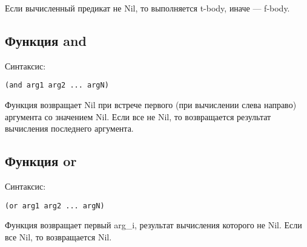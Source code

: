 Если вычисленный предикат не Nil, то выполняется t-body, иначе ---
\mbox{f-body}.

\subsection{Функция and}

Синтаксис:

\vspace{4mm}
\begin{minipage}{0.92\linewidth}
\begin{lstlisting}
(and arg1 arg2 ... argN)
\end{lstlisting}
\end{minipage}

Функция возвращает Nil при встрече первого (при вычислении слева направо)
аргумента со значением Nil. Если
все не Nil, то возвращается результат вычисления последнего аргумента.

\subsection{Функция or}

Синтаксис:

\vspace{4mm}
\begin{minipage}{0.92\linewidth}
\begin{lstlisting}
(or arg1 arg2 ... argN)
\end{lstlisting}
\end{minipage}

Функция возвращает первый arg\_i, результат вычисления которого не
Nil. Если все Nil, то возвращается Nil.
